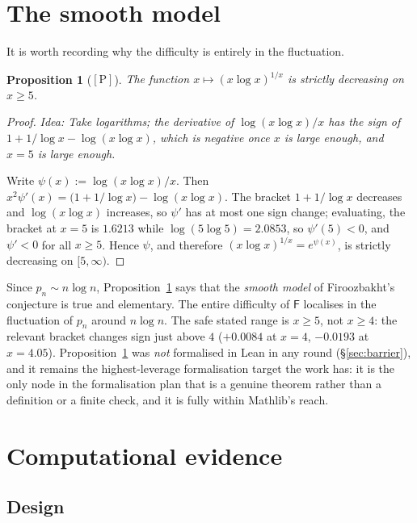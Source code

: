 \documentclass[11pt,a4paper]{article}
\theoremstyle{plain}
\newtheorem{proposition}[theorem]{Proposition}
\theoremstyle{definition}
\theoremstyle{remark}
\newcommand{\idea}[1]{\emph{Idea: #1}\par\smallskip}
\newcommand{\cP}{{[\mathrm{P}]}}
\newcommand{\Fb}{\mathsf{F}}
\begin{document}
\section{The smooth model}
\label{sec:smooth}

It is worth recording why the difficulty is entirely in the fluctuation.

\begin{proposition}[$\cP$]
\label{prop:smooth}
The function $x \mapsto (x\log x)^{1/x}$ is strictly decreasing on $x \ge 5$.
\end{proposition}

\begin{proof}
\idea{Take logarithms; the derivative of $\log(x\log x)/x$ has the sign of
$1 + 1/\log x - \log(x\log x)$, which is negative once $x$ is large enough, and $x = 5$ is
large enough.}
Write $\psi(x) := \log(x\log x)/x$. Then
$x^2\psi'(x) = \bigl(1 + 1/\log x\bigr) - \log(x\log x)$. The bracket
$1 + 1/\log x$ decreases and $\log(x\log x)$ increases, so $\psi'$ has at most one sign
change; evaluating, the bracket at $x=5$ is $1.6213$ while $\log(5\log 5) = 2.0853$, so
$\psi'(5) < 0$, and $\psi' < 0$ for all $x \ge 5$. Hence $\psi$, and therefore
$(x\log x)^{1/x} = e^{\psi(x)}$, is strictly decreasing on $[5,\infty)$.
\end{proof}

Since $p_n \sim n\log n$, Proposition~\ref{prop:smooth} says that the \emph{smooth model} of
Firoozbakht's conjecture is true and elementary. The entire difficulty of $\Fb$ localises in
the fluctuation of $p_n$ around $n\log n$. The safe stated range is $x \ge 5$, not $x \ge 4$:
the relevant bracket changes sign just above $4$ ($+0.0084$ at $x=4$, $-0.0193$ at $x = 4.05$).
Proposition~\ref{prop:smooth} was \emph{not} formalised in Lean in any round
(\S\ref{sec:barrier}), and it remains the highest-leverage formalisation target the work has:
it is the only node in the formalisation plan that is a genuine theorem rather than a
definition or a finite check, and it is fully within Mathlib's reach.

\section{Computational evidence}
\label{sec:computation}

\subsection{Design}
\end{document}
